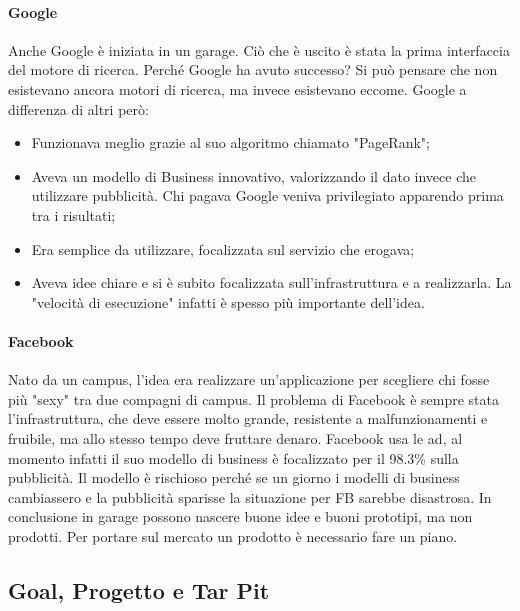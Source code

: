 \paragraph{Google}
Anche Google è iniziata in un garage. Ciò che è uscito è stata la prima interfaccia del motore di ricerca. Perché Google ha avuto successo? Si può pensare che non esistevano ancora motori di ricerca, ma invece esistevano eccome.\newline
Google a differenza di altri però:
\begin{itemize}
	\item Funzionava meglio grazie al suo algoritmo chiamato "PageRank";
	\item Aveva un modello di Business innovativo, valorizzando il dato invece che utilizzare pubblicità. Chi pagava Google veniva privilegiato apparendo prima tra i risultati;
	\item Era semplice da utilizzare, focalizzata sul servizio che erogava;
	\item Aveva idee chiare e si è subito focalizzata sull'infrastruttura e a realizzarla. La "velocità di esecuzione" infatti è spesso più importante dell'idea.
\end{itemize}
\paragraph{Facebook}
Nato da un campus, l'idea era realizzare un'applicazione per scegliere chi fosse più "sexy" tra due compagni di campus. Il problema di Facebook è sempre stata l'infrastruttura, che deve essere molto grande, resistente a malfunzionamenti e fruibile, ma allo stesso tempo deve fruttare denaro. Facebook usa le ad, al momento infatti il suo modello di business è focalizzato per il 98.3\% sulla pubblicità. Il modello è rischioso perché se un giorno i modelli di business cambiassero e la pubblicità sparisse la situazione per FB sarebbe disastrosa.\newline\newline
In conclusione in garage possono nascere buone idee e buoni prototipi, ma non prodotti. Per portare sul mercato un prodotto è necessario fare un piano.
\subsection{Goal, Progetto e Tar Pit}

